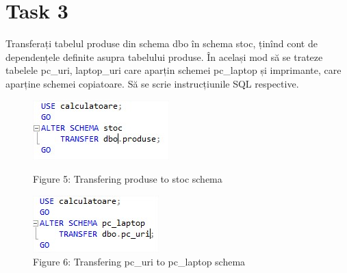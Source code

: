 \section{Task 3}
Transferați tabelul produse din schema dbo în schema stoc, ținînd cont de dependențele definite asupra tabelului produse. În același mod să se trateze tabelele pc\_uri, laptop\_uri care aparțin schemei pc\_laptop și imprimante, care aparține schemei copiatoare. Să se scrie instrucțiunile SQL respective.

\begin{figure}[H]
	\centering
		\includegraphics[width=\linewidth]{screens/6.jpg}
		\caption*{Figure 5: Transfering produse to stoc schema}
		\label{}
	\endminipage\hfill
		\includegraphics[width=\linewidth]{screens/7.jpg}
		\caption*{Figure 6: Transfering pc\_uri to pc\_laptop schema}
	\endminipage
\end{figure}

